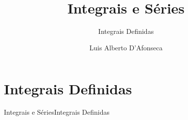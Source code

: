 
\usepackage{apresentacao}
\usepackage{tabto}

\makeatletter
\graphicspath  {{./figs/}}
\makeatother

\newcommand{\mytitle}   {Integrais e Séries}
\newcommand{\mysubtitle}{Integrais Definidas}
\title   {\mytitle}
\subtitle{\mysubtitle}
\author  {\large Luis Alberto D'Afonseca}
\date    {}



\begin{frame}
    \titlepage
\end{frame}

\section{Integrais Definidas}

\begin{frame}{\mytitle}{\mysubtitle}
  \tableofcontents
\end{frame}


